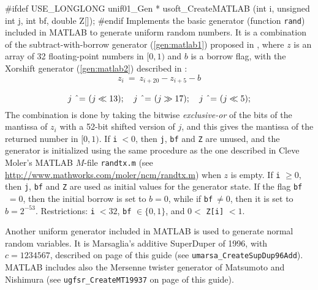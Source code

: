 {#ifdef USE_LONGLONG
   unif01_Gen * usoft_CreateMATLAB (int i, unsigned int j, int bf,
                                    double Z[]);
#endif
\endcode
  \tab Implements the basic generator  (function {\tt rand}) included in
 {\sc MATLAB} \cite{rMOL04a} to generate uniform random numbers.
  It is %
  a combination of the subtract-with-borrow generator
  (\ref{gen:matlab1}) proposed in \cite{rMAR91a}, where $z$ is an array of 
 32 floating-point numbers in $[0, 1)$ and $b$ is a borrow flag, with the
  Xorshift generator (\ref{gen:matlab2}) described in \cite{rMAR03a}:
\begin{equation}
  z_i \  =\   z_{i+20} -  z_{i+5} - b \label{gen:matlab1} 
\end{equation}
\begin{equation}
 \rule{0pt}{14pt} j \mbox{ \^{}= } (j\ll13);\quad  j \mbox{ \^{}= } (j\gg17);
   \quad  j \mbox{ \^{}= } (j\ll5); \label{gen:matlab2}
\end{equation}
  The  combination is done by taking the bitwise \emph{exclusive-or} of 
  the bits of the mantissa of $z_i$ with a 52-bit shifted version 
  of $j$, and this gives the mantissa of the returned number in $[0, 1)$.
  If \texttt{i}$\; <0$, then \texttt{j},  \texttt{bf}  and \texttt{Z}
  are unused, and the generator is initialized using the same 
  procedure as the one described in Cleve Moler's MATLAB
  $M$-file \texttt{randtx.m}
  (see \url{http://www.mathworks.com/moler/ncm/randtx.m})
  when $z$ is empty. If \texttt{i} $\ge 0$, then \texttt{j},  \texttt{bf}
  and \texttt{Z} are used as initial values for the generator state.
  If the flag \texttt{bf}$\;=0$, then the initial
  borrow is set to $b=0$, while if \texttt{bf}$\ \ne 0$, then
   it is set to  $b=2^{-53}$.
   Restrictions: \texttt{i}$\; < 32$, \texttt{bf} $\in \{0, 1\}$,
    and $0 <$ \texttt{Z[i]} $ < 1$.

  Another uniform generator included in {\sc MATLAB} is used to
  generate normal random variables. It is
  Marsaglia's additive SuperDuper of 1996, with $c=1234567$, described on page
   \pageref{gen:SupDup96} of this guide (see {\tt umarsa\_CreateSupDup96Add}).
  {\sc MATLAB} includes also  the Mersenne twister generator
  of Matsumoto and Nishimura \cite{rMAT98a} (see {\tt ugfsr\_CreateMT19937}
  on page \pageref{rng:MT19937} of this guide).
  \endtab
\code


}
